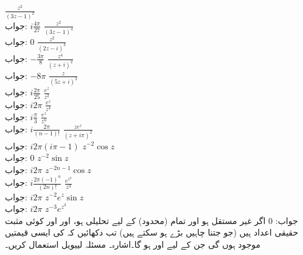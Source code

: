 \quad
$\tfrac{z^2}{(3z-1)^2}$\\
جواب:\quad
$i\tfrac{4\pi}{27}$
\quad
$\tfrac{z^2}{(3z-1)^4}$\\
جواب:\quad
$0$
\quad
$\tfrac{z^2}{(2z-i)^3}$\\
جواب:\quad
$-\tfrac{3\pi}{8}$
\quad
$\tfrac{z^4}{(z+i)^2}$\\
جواب:\quad
$-8\pi$
\quad
$\tfrac{z}{(5z+i)^2}$\\
جواب:\quad
$i\tfrac{2\pi}{25}$
\quad
$\tfrac{e^z}{z^2}$\\
جواب:\quad
$i2\pi$
\quad
$\tfrac{e^z}{z^4}$\\
جواب:\quad
$i\tfrac{\pi}{3}$
\quad
$\tfrac{e^z}{z^n}$\\
جواب:\quad
$i\tfrac{2\pi}{(n-1)!}$
\quad
$\tfrac{ze^z}{(z+i\pi)^2}$\\
جواب:\quad
$i2\pi(i\pi-1)$
\quad
$z^{-2}\cos z$\\
جواب:\quad
$0$
\quad
$z^{-2}\sin z$\\
جواب:\quad
$i2\pi$
\quad
$z^{-2n-1}\cos z$\\
جواب:\quad
$i\tfrac{2\pi (-1)^n}{(2n)!}$
\quad
$\tfrac{e^{z^2}}{z^3}$\\
جواب:\quad
$i2\pi$
\quad
$z^{-2}e^z\sin z$\\
جواب:\quad
$i2\pi$
\quad
$z^{-3}e^{z^3}$\\
جواب:\quad
$0$
\quad
اگر  غیر مستقل ہو اور تمام (محدود)  کے لیے تحلیلی ہو، اور  اور  کوئی مثبت حقیقی اعداد ہیں (جو جتنا چاہیں بڑے ہو سکتے ہیں) تب دکھائیں کہ  کی ایسی قیمتیں موجود ہوں گی جن کے لیے  اور  ہو گا۔اشارہ۔ مسئلہ لییویل استعمال کریں۔
